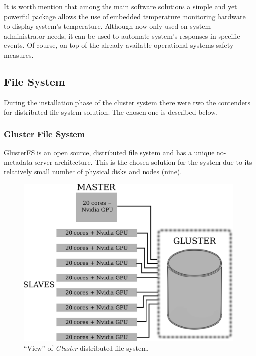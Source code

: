\documentclass[twoside,a4paper,12pt,english]{inac19}
\begin{document}
It is worth mention that among the main software solutions a simple and yet powerful package 
allows the use of embedded temperature monitoring hardware to display system's temperature. 
Although now only used on system administrator needs, it can be used to automate system's 
responses in specific events. Of course, on top of the already available operational systems 
safety measures. 

\subsection{File System}

During the installation phase of the cluster system there were two the contenders for
distributed file system solution. The chosen one is described below.

\subsubsection{Gluster File System}

GlusterFS\cite{gluster} is an open source, distributed file system and has
a unique no-metadata server architecture. This is the chosen solution for the system due to its relatively
small number of physical disks and nodes (nine).

\begin{figure}[ht] %
  \centering\includegraphics[scale=0.7]{images/cluster-gluster.png}
  \caption{``View'' of \textit{Gluster} distributed file system.}
  \label{fig:cluster-gluster}
\end{figure}
\end{document}
